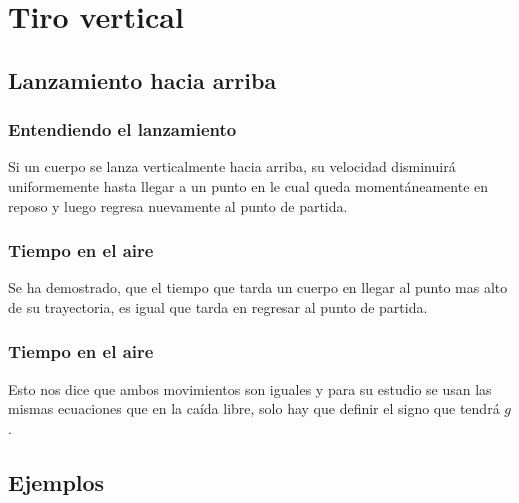 \documentclass[14pt]{beamer}
\begin{document}
\section{Tiro vertical}
\subsection{Lanzamiento hacia arriba}

\begin{frame}
\frametitle{Entendiendo el lanzamiento}
Si un cuerpo se lanza verticalmente hacia arriba, su velocidad disminuirá uniformemente hasta llegar a un punto en le cual queda momentáneamente en reposo y luego regresa nuevamente al punto de partida.
\end{frame}
\begin{frame}
\frametitle{Tiempo en el aire}
Se ha demostrado, que el tiempo que tarda un cuerpo en llegar al punto mas alto de su trayectoria, \pause es igual que tarda en regresar al punto de partida.
\end{frame}
\begin{frame}
\frametitle{Tiempo en el aire}
Esto nos dice que ambos movimientos son iguales y para su estudio se usan las mismas ecuaciones que en la caída libre, solo hay que definir el signo que tendrá $g$.
\end{frame}

\subsection{Ejemplos}
\end{document}
